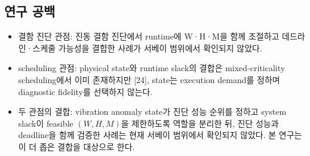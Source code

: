 \documentclass[10pt]{article}
\begin{document}
\subsection{연구 공백}
\begin{itemize}
\item 결함 진단 관점: 진동 결함 진단에서 runtime에 W·H·M을 함께 조절하고 데드라인·스케줄 가능성을 결합한 사례가 서베이 범위에서 확인되지 않았다.
\item scheduling 관점: physical state와 runtime slack의 결합은 mixed-criticality scheduling에서 이미 존재하지만 [24], state는 execution demand를 정하며 diagnostic fidelity를 선택하지 않는다.
\item 두 관점의 결합: vibration anomaly state가 진단 성능 순위를 정하고 system slack이 feasible $(W,H,M)$을 제한하도록 역할을 분리한 뒤, 진단 성능과 deadline을 함께 검증한 사례는 현재 서베이 범위에서 확인되지 않았다. 본 연구는 이 더 좁은 결합을 대상으로 한다.
\end{itemize}
\end{document}
